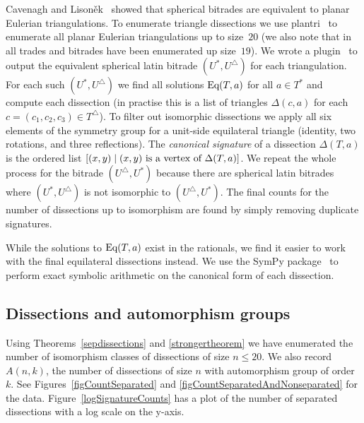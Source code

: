 \documentclass[12pt,amstags,fleqn]{article}
\theoremstyle{plain}
\theoremstyle{definition}
\def\ll{{\textstyle \ast}}
\def\rr{{\scriptscriptstyle \triangle}}
\newcommand{\opa}{\ll}
\newcommand{\opb}{\rr}
\newcommand{\eq}{\textnormal{Eq}}
\begin{document}
Cavenagh and Lison\v ek~\cite{planareulerian} showed that spherical
bitrades are equivalent to planar Eulerian triangulations. To enumerate
triangle dissections we
use plantri~\cite{plantri,plantri2} to enumerate all planar
Eulerian triangulations up to size~$20$ (we also note that
in~\cite{wanlessenumeration} all trades and bitrades have been
enumerated up size~$19$). We wrote a 
plugin~\cite{code} to output the equivalent spherical latin bitrade
$(U^{\opa}, U^{\opb})$ for each triangulation. For each such
$(U^{\opa},U^{\opb})$ we find all
solutions $\eq(T, a)$ for all $a \in T^{\opa}$ and compute each
dissection (in practise this is a list of triangles $\Delta(c,a)$ for
each $c = (c_1,c_2,c_3) \in T^{\rr}$).
To filter out isomorphic dissections we apply all six elements of
the symmetry group for a unit-side equilateral triangle (identity, two rotations,
and three reflections). The {\em canonical signature} of a dissection 
$\Delta(T,a)$ is
the ordered list $[(x,y) \mid (x,y) \textnormal{ is a
vertex of $\Delta(T,a)$}]$. We repeat the whole process for the bitrade $(U^{\opb},U^{\opa})$
because there are spherical latin bitrades where
$(U^{\opa},U^{\opb})$ is not isomorphic to $(U^{\opb},U^{\opa})$. The
final counts for the number of dissections up to isomorphism are found
by simply removing duplicate signatures.

While the solutions to $\eq(T, a)$ exist in the rationals, we find it
easier to work with the final equilateral dissections instead. We use the SymPy package~\cite{sympy} to perform
exact symbolic arithmetic on the canonical form of each dissection.


\subsection{Dissections and automorphism groups}

Using Theorems~\ref{sepdissections} and \ref{strongertheorem}
we have enumerated the number of isomorphism classes of
dissections of size $n \leq 20$. We also record $A(n,k)$, the
number of dissections of size $n$ with
automorphism group of order $k$. See Figures~\ref{figCountSeparated} and
\ref{figCountSeparatedAndNonseparated} for the data. Figure~\ref{logSignatureCounts} has a plot of the 
number of separated dissections with a log scale on the y-axis.
\end{document}
